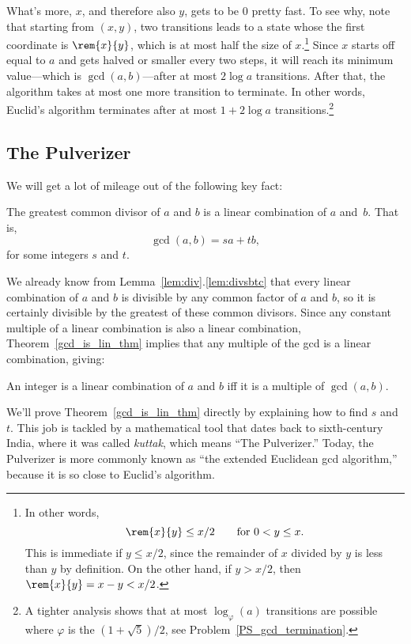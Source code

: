 What's more, $x$, and therefore also $y$, gets to be 0 pretty fast.
To see why, note that starting from $(x,y)$, two transitions leads to
a state whose the first coordinate is $\rem{x}{y}$, which is at most
half the size of $x$.\footnote{In other words,
\begin{equation}\label{rxylx2}
\rem{x}{y} \le x/2 \qquad \text{for $0 < y \le x$}.
\end{equation}
This is immediate if $y \le x/2$, since the remainder of $x$ divided
by $y$ is less than $y$ by definition.  On the other hand, if $y >
x/2$, then $\rem{x}{y} = x - y < x/2$.}  Since $x$ starts off equal to
$a$ and gets halved or smaller every two steps, it will reach its
minimum value---which is $\gcd(a,b)$---after at most $2 \log a$
transitions.  After that, the algorithm takes at most one more
transition to terminate.  In other words, Euclid's algorithm
terminates after at most $1+2 \log a$ transitions.\footnote{A tighter
  analysis shows that at most $\log_\varphi(a)$ transitions are
  possible where $\varphi$ is the  $(1 +
  \sqrt{5})/2$, see Problem~\ref{PS_gcd_termination}.}

\subsection{The Pulverizer}\label{sec:pulverizer}
We will get a lot of mileage out of the following key fact:
\begin{theorem}\label{gcd_is_lin_thm}
The greatest common divisor of $a$ and $b$ is a linear combination of
$a$ and~$b$.  That is,
\[
\gcd(a, b) = s a + t b,
\]
for some integers $s$ and $t$.
\end{theorem}

We already know from Lemma~\ref{lem:div}.\ref{lem:divsbtc} that every
linear combination of $a$ and $b$ is divisible by any common factor of
$a$ and $b$, so it is certainly divisible by the greatest of these
common divisors.  Since any constant multiple of a linear combination
is also a linear combination, Theorem~\ref{gcd_is_lin_thm} implies
that any multiple of the gcd is a linear combination, giving:
\begin{corollary}\label{cor:lin-comb}
An integer is a linear combination of $a$ and $b$ iff it is a multiple
of $\gcd(a, b)$.
\end{corollary}

We'll prove Theorem~\ref{gcd_is_lin_thm} directly by explaining how to
find $s$ and $t$.  This job is tackled by a mathematical tool that
dates back to sixth-century India, where it was called \emph{kuttak},
which means ``The Pulverizer.''  Today, the Pulverizer%
is more commonly known as ``the extended Euclidean gcd algorithm,'' because it
is so close to Euclid's algorithm.

